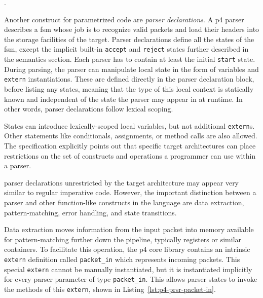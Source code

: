 .

Another construct for parametrized code are \emph{parser declarations}. A
\acrshort{p4} parser describes a \acrlong{fsm} whose job is to recognize valid
packets and load their headers into the storage facilities of the target. Parser
declarations define all the states of the \acrshort{fsm}, except the implicit
built-in \texttt{accept} and \texttt{reject} states further described in the
semantics section. Each parser has to contain at least the
initial \texttt{start} state. During parsing, the parser can manipulate local
state in the form of variables and \texttt{extern}
instantiations. These are defined directly in the parser declaration block,
before listing any states, meaning that the type of this local context is
statically known and independent of the state the parser may appear in at
runtime. In other words, parser declarations follow lexical scoping.

States can introduce lexically-scoped local variables, but not additional
\texttt{extern}s. Other statements like conditionals, assignments, or method
calls are also allowed. The specification explicitly points out that specific
target architectures can place restrictions on the set of constructs and
operations a programmer can use within a parser.

\pfs parser declarations unrestricted by the target architecture may appear very
similar to regular imperative code. However, the important distinction between a
parser and other function-like constructs in the \pfs language are data
extraction, pattern-matching, error handling, and state transitions.

Data extraction moves information from the input packet into memory available
for pattern-matching further down the pipeline, typically registers or similar
containers. To facilitate this operation, the \acrshort{p4} core library
contains an intrinsic \texttt{extern} definition called
\texttt{packet\_in} which represents incoming packets. This special
\texttt{extern} cannot be manually instantiated, but it is instantiated implicitly for every parser
parameter of type \texttt{packet\_in}. This allows parser
states to invoke the methods of this \texttt{extern}, shown in
Listing~\ref{lst:p4-prsr-packet-in}.

